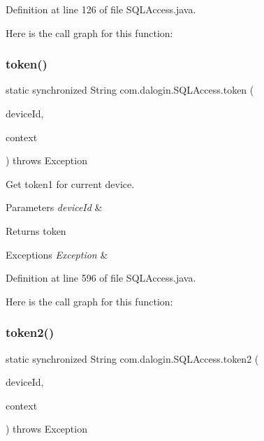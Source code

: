 Definition at line 126 of file S\+Q\+L\+Access.\+java.

Here is the call graph for this function\+:
\mbox{\label{classcom_1_1dalogin_1_1_s_q_l_access_a99e9cb8ca2d123adec597e0b4cd063f7}} 
\subsubsection{\texorpdfstring{token()}{token()}}
{\footnotesize\ttfamily static synchronized String com.\+dalogin.\+S\+Q\+L\+Access.\+token (\begin{DoxyParamCaption}\item[{String}]{device\+Id,  }\item[{Servlet\+Context}]{context }\end{DoxyParamCaption}) throws Exception\hspace{0.3cm}{\ttfamily [static]}}

Get token1 for current device.


\begin{DoxyParams}{Parameters}
{\em device\+Id} & \\
\hline
\end{DoxyParams}
\begin{DoxyReturn}{Returns}
token 
\end{DoxyReturn}

\begin{DoxyExceptions}{Exceptions}
{\em Exception} & \\
\hline
\end{DoxyExceptions}


Definition at line 596 of file S\+Q\+L\+Access.\+java.

Here is the call graph for this function\+:
\mbox{\label{classcom_1_1dalogin_1_1_s_q_l_access_aefba2c4140aa1a1f287c44aaedcad345}} 
\subsubsection{\texorpdfstring{token2()}{token2()}}
{\footnotesize\ttfamily static synchronized String com.\+dalogin.\+S\+Q\+L\+Access.\+token2 (\begin{DoxyParamCaption}\item[{String}]{device\+Id,  }\item[{Servlet\+Context}]{context }\end{DoxyParamCaption}) throws Exception\hspace{0.3cm}{\ttfamily [static]}}

